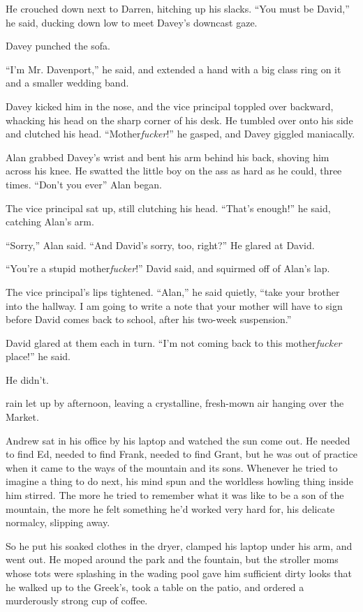He crouched down next to Darren, hitching up his slacks.  ``You must
be David,'' he said, ducking down low to meet Davey's downcast gaze.

Davey punched the sofa.

``I'm Mr.  Davenport,'' he said, and extended a hand with a big class
ring on it and a smaller wedding band.

Davey kicked him in the nose, and the vice principal toppled over
backward, whacking his head on the sharp corner of his desk.  He
tumbled over onto his side and clutched his head. 
``Mother\textit{fucker}!'' he gasped, and Davey giggled maniacally.

Alan grabbed Davey's wrist and bent his arm behind his back, shoving
him across his knee.  He swatted the little boy on the ass as hard as
he could, three times.  ``Don't you ever\dash{}'' Alan began.

The vice principal sat up, still clutching his head.  ``That's
enough!'' he said, catching Alan's arm.

``Sorry,'' Alan said.  ``And David's sorry, too, right?'' He glared at
David.

``You're a stupid mother\textit{fucker}!'' David said, and squirmed
off of Alan's lap.

The vice principal's lips tightened.  ``Alan,'' he said quietly,
``take your brother into the hallway.  I am going to write a note that
your mother will have to sign before David comes back to school, after
his two-week suspension.''

David glared at them each in turn.  ``I'm not coming back to this
mother\textit{fucker} place!'' he said.

He didn't.

 rain let up by afternoon, leaving a crystalline, fresh-mown air
hanging over the Market.

Andrew sat in his office by his laptop and watched the sun come out. 
He needed to find Ed, needed to find Frank, needed to find Grant, but
he was out of practice when it came to the ways of the mountain and
its sons.  Whenever he tried to imagine a thing to do next, his mind
spun and the worldless howling thing inside him stirred.  The more he
tried to remember what it was like to be a son of the mountain, the
more he felt something he'd worked very hard for, his delicate
normalcy, slipping away.

So he put his soaked clothes in the dryer, clamped his laptop under
his arm, and went out.  He moped around the park and the fountain, but
the stroller moms whose tots were splashing in the wading pool gave
him sufficient dirty looks that he walked up to the Greek's, took a
table on the patio, and ordered a murderously strong cup of coffee.

